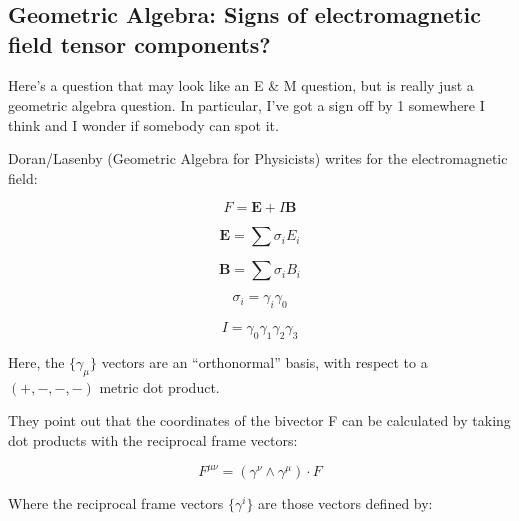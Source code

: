 
%

%
%

\chapter{} %



\section{Geometric Algebra: Signs of electromagnetic field tensor components? }

Here's a question that may look like an E \& M question, but is really just a geometric algebra question.  In particular, I've got a sign off by 1 somewhere I think and I wonder if somebody can spot it.

Doran/Lasenby (Geometric Algebra for Physicists) writes for the electromagnetic field:

\[
F = \mathbf{E} + I\mathbf{B}
\]

\[
\mathbf{E} = \sum \sigma_i E_i
\]

\[
\mathbf{B} = \sum \sigma_i B_i
\]

\[
\sigma_i = \gamma_i \gamma_0
\]

\[
I = \gamma_0 \gamma_1 \gamma_2 \gamma_3
\]

Here, the $\{\gamma_\mu\}$ vectors are an ``orthonormal'' basis, with respect to a $(+,-,-,-)$ metric dot product.

They point out that the coordinates of the bivector F can be calculated by taking dot products with the reciprocal frame vectors:

\[
F^{\mu\nu} = (\gamma^\nu \wedge \gamma^\mu) \cdot F
\]

Where the reciprocal frame vectors $\{\gamma^i\}$ are those vectors defined by:

